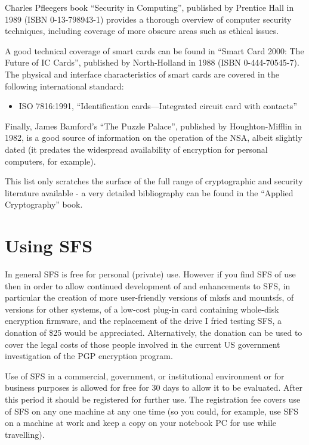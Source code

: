 Charles Pfleegers book ``Security in Computing'', published by Prentice Hall in
1989 (ISBN 0-13-798943-1) provides a thorough overview of computer security
techniques, including coverage of more obscure areas such as ethical issues.

A good technical coverage of smart cards can be found in ``Smart Card 2000: The
Future of IC Cards'', published by North-Holland in 1988 (ISBN 0-444-70545-7).
The physical and interface characteristics of smart cards are covered in the
following international standard:

\begin{itemize}
\item ISO 7816:1991, ``Identification cards---Integrated circuit card with
        contacts''
\end{itemize}

Finally, James Bamford's ``The Puzzle Palace'', published by Houghton-Mifflin in
1982, is a good source of information on the operation of the NSA, albeit
slightly dated (it predates the widespread availability of encryption for
personal computers, for example).

This list only scratches the surface of the full range of cryptographic and
security literature available - a very detailed bibliography can be found in
the ``Applied Cryptography'' book.


\section{Using SFS}

In general SFS is free for personal (private) use.  However if you find SFS of
use then in order to allow continued development of and enhancements to SFS, in
particular the creation of more user-friendly versions of mksfs and mountsfs,
of versions for other systems, of a low-cost plug-in card containing whole-disk
encryption firmware, and the replacement of the drive I fried testing SFS, a
donation of \$25 would be appreciated.  Alternatively, the donation can be used
to cover the legal costs of those people involved in the current US government
investigation of the PGP encryption program.

Use of SFS in a commercial, government, or institutional environment or for
business purposes is allowed for free for 30 days to allow it to be evaluated.
After this period it should be registered for further use.  The registration
fee covers use of SFS on any one machine at any one time (so you could, for
example, use SFS on a machine at work and keep a copy on your notebook PC for
use while travelling).


